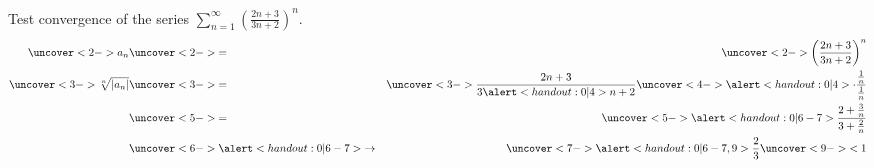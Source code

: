 \begin{frame}
\begin{example}[Example 4, p. 753]
Test convergence of the series $\displaystyle \sum_{n=1}^\infty \left( \frac{2n + 3}{3n+2}\right)^n$.
\abovedisplayskip=0pt
\belowdisplayskip=0pt
\begin{eqnarray*}
\uncover<2->{%
a_n %
}%
 & \uncover<2->{=} & %
\uncover<2->{%
\left( \frac{2n+3}{3n+2}\right)^n%
}\\%
\uncover<3->{%
\sqrt[n]{\left| a_n\right|} %
}%
 & \uncover<3->{=} & %
\uncover<3->{%
\frac{2n+3}{3\alert<handout:0| 4>{n}+2}\uncover<4->{\alert<handout:0| 4>{\cdot \frac{\frac{1}{n}}{\frac{1}{n}}}}%
}\\%
 & \uncover<5->{=} & %
\uncover<5->{%
\alert<handout:0| 6-7>{%
\frac{2 + \frac{3}{n}}{3+\frac{2}{n}}%
}%
}\\%
 & \uncover<6->{\alert<handout:0| 6-7>{\to}} & %
\uncover<7->{%
\alert<handout:0| 6-7,9>{%
\frac{2}{3} \uncover<9->{ < 1 }
}%
}%
\end{eqnarray*}
%
\end{example}
\end{frame}
